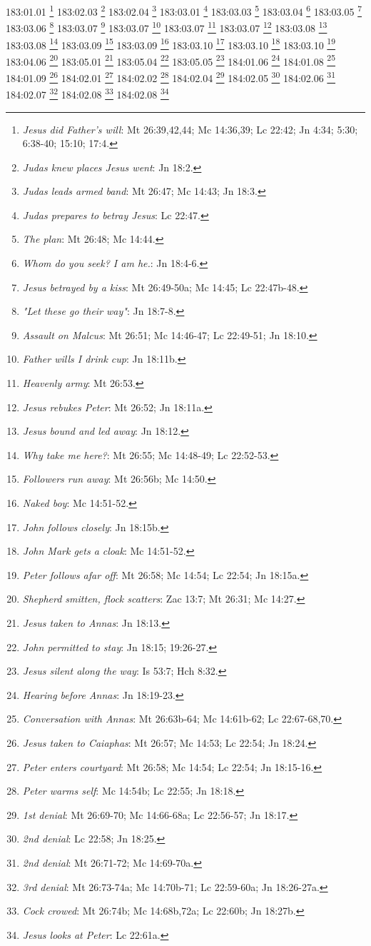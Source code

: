 183:01.01 \footnote{\textit{Jesus did Father's will}: Mt 26:39,42,44; Mc 14:36,39; Lc 22:42; Jn 4:34; 5:30; 6:38-40; 15:10; 17:4.}
183:02.03 \footnote{\textit{Judas knew places Jesus went}: Jn 18:2.}
183:02.04 \footnote{\textit{Judas leads armed band}: Mt 26:47; Mc 14:43; Jn 18:3.}
183:03.01 \footnote{\textit{Judas prepares to betray Jesus}: Lc 22:47.}
183:03.03 \footnote{\textit{The plan}: Mt 26:48; Mc 14:44.}
183:03.04 \footnote{\textit{Whom do you seek? I am he.}: Jn 18:4-6.}
183:03.05 \footnote{\textit{Jesus betrayed by a kiss}: Mt 26:49-50a; Mc 14:45; Lc 22:47b-48.}
183:03.06 \footnote{\textit{"Let these go their way"}: Jn 18:7-8.}
183:03.07 \footnote{\textit{Assault on Malcus}: Mt 26:51; Mc 14:46-47; Lc 22:49-51; Jn 18:10.}
183:03.07 \footnote{\textit{Father wills I drink cup}: Jn 18:11b.}
183:03.07 \footnote{\textit{Heavenly army}: Mt 26:53.}
183:03.07 \footnote{\textit{Jesus rebukes Peter}: Mt 26:52; Jn 18:11a.}
183:03.08 \footnote{\textit{Jesus bound and led away}: Jn 18:12.}
183:03.08 \footnote{\textit{Why take me here?}: Mt 26:55; Mc 14:48-49; Lc 22:52-53.}
183:03.09 \footnote{\textit{Followers run away}: Mt 26:56b; Mc 14:50.}
183:03.09 \footnote{\textit{Naked boy}: Mc 14:51-52.}
183:03.10 \footnote{\textit{John follows closely}: Jn 18:15b.}
183:03.10 \footnote{\textit{John Mark gets a cloak}: Mc 14:51-52.}
183:03.10 \footnote{\textit{Peter follows afar off}: Mt 26:58; Mc 14:54; Lc 22:54; Jn 18:15a.}
183:04.06 \footnote{\textit{Shepherd smitten, flock scatters}: Zac 13:7; Mt 26:31; Mc 14:27.}
183:05.01 \footnote{\textit{Jesus taken to Annas}: Jn 18:13.}
183:05.04 \footnote{\textit{John permitted to stay}: Jn 18:15; 19:26-27.}
183:05.05 \footnote{\textit{Jesus silent along the way}: Is 53:7; Hch 8:32.}
184:01.06 \footnote{\textit{Hearing before Annas}: Jn 18:19-23.}
184:01.08 \footnote{\textit{Conversation with Annas}: Mt 26:63b-64; Mc 14:61b-62; Lc 22:67-68,70.}
184:01.09 \footnote{\textit{Jesus taken to Caiaphas}: Mt 26:57; Mc 14:53; Lc 22:54; Jn 18:24.}
184:02.01 \footnote{\textit{Peter enters courtyard}: Mt 26:58; Mc 14:54; Lc 22:54; Jn 18:15-16.}
184:02.02 \footnote{\textit{Peter warms self}: Mc 14:54b; Lc 22:55; Jn 18:18.}
184:02.04 \footnote{\textit{1st denial}: Mt 26:69-70; Mc 14:66-68a; Lc 22:56-57; Jn 18:17.}
184:02.05 \footnote{\textit{2nd denial}: Lc 22:58; Jn 18:25.}
184:02.06 \footnote{\textit{2nd denial}: Mt 26:71-72; Mc 14:69-70a.}
184:02.07 \footnote{\textit{3rd denial}: Mt 26:73-74a; Mc 14:70b-71; Lc 22:59-60a; Jn 18:26-27a.}
184:02.08 \footnote{\textit{Cock crowed}: Mt 26:74b; Mc 14:68b,72a; Lc 22:60b; Jn 18:27b.}
184:02.08 \footnote{\textit{Jesus looks at Peter}: Lc 22:61a.}
